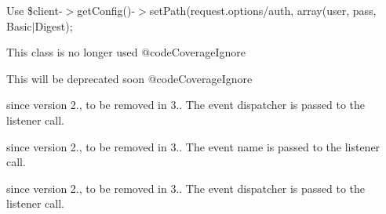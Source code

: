 \begin{DoxyRefList}
\item[Class \mbox{\hyperlink{class_guzzle_1_1_plugin_1_1_curl_auth_1_1_curl_auth_plugin}{Curl\+Auth\+Plugin}} ]\label{deprecated__deprecated000031}%
%
Use \$client-\/$>$get\+Config()-\/$>$set\+Path(\textquotesingle{}request.\+options/auth\textquotesingle{}, array(\textquotesingle{}user\textquotesingle{}, \textquotesingle{}pass\textquotesingle{}, \textquotesingle{}Basic$\vert$\+Digest\textquotesingle{});  
\item[Class \mbox{\hyperlink{class_guzzle_1_1_plugin_1_1_cache_1_1_default_cache_key_provider}{Default\+Cache\+Key\+Provider}} ]\label{deprecated__deprecated000030}%
%
This class is no longer used @code\+Coverage\+Ignore  
\item[Global \mbox{\hyperlink{class_guzzle_1_1_http_1_1_entity_body_abaf4d40eb1fd67b3ec76523d91173afd}{Entity\+Body\+::calculate\+Md5}} (\mbox{\hyperlink{interface_guzzle_1_1_http_1_1_entity_body_interface}{Entity\+Body\+Interface}} \$body, \$raw\+Output=false, \$base64\+Encode=false)]\label{deprecated__deprecated000009}%
%
This will be deprecated soon @code\+Coverage\+Ignore  
\item[Global \mbox{\hyperlink{class_symfony_1_1_component_1_1_event_dispatcher_1_1_event_a2c6ae191baffbfeb2260f88736bbb15b}{Event\+::get\+Dispatcher}} ()]\label{deprecated__deprecated000044}%
%
since version 2., to be removed in 3.. The event dispatcher is passed to the listener call.  
\item[Global \mbox{\hyperlink{class_symfony_1_1_component_1_1_event_dispatcher_1_1_event_a3d0963e68bb313b163a73f2803c64600}{Event\+::get\+Name}} ()]\label{deprecated__deprecated000045}%
%
since version 2., to be removed in 3.. The event name is passed to the listener call.  
\item[Global \mbox{\hyperlink{class_symfony_1_1_component_1_1_event_dispatcher_1_1_event_a252ca50faa2dd791f777a5ee40ee27ae}{Event\+::set\+Dispatcher}} (\mbox{\hyperlink{interface_symfony_1_1_component_1_1_event_dispatcher_1_1_event_dispatcher_interface}{Event\+Dispatcher\+Interface}} \$dispatcher)]\label{deprecated__deprecated000043}%
%
since version 2., to be removed in 3.. The event dispatcher is passed to the listener call.  
\item[Global \mbox{\hyperlink{class_symfony_1_1_component_1_1_event_dispatcher_1_1_event_a2fe666694997d047711d7653eca2f132}{Event\+::set\+Name}} (\$name)]\label{deprecated__deprecated000046}%

\end{DoxyRefList}
